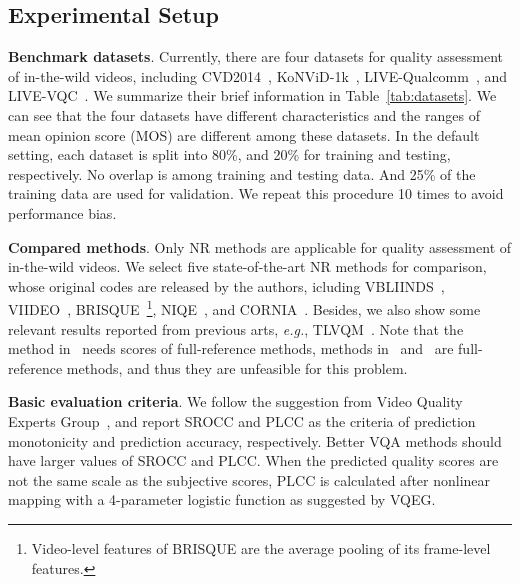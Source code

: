 \documentclass[twocolumn]{svjour3}          \smartqed  \usepackage{graphicx}
\begin{document}
\subsection{Experimental Setup}
\indent\indent\textbf{Benchmark datasets}. 
Currently, there are four datasets for quality assessment of in-the-wild videos, including CVD2014~\citep{nuutinen2016cvd2014}, KoNViD-1k~\citep{hosu2017konstanz}, LIVE-Qualcomm~\citep{ghadiyaram2018capture}, and LIVE-VQC~\citep{sinno2019large}. 
We summarize their brief information in Table~\ref{tab:datasets}. 
We can see that the four datasets have different characteristics and the ranges of mean opinion score (MOS) are different among these datasets. 
In the default setting, each dataset is split into 80\%, and 20\% for training and testing, respectively. 
No overlap is among training and testing data. 
And 25\% of the training data are used for validation.
We repeat this procedure 10 times to avoid performance bias.


\textbf{Compared methods}. 
Only NR methods are applicable for quality assessment of in-the-wild videos.
We select five state-of-the-art NR methods for comparison, whose original codes are released by the authors, icluding VBLIINDS~\citep{saad2014blind}, VIIDEO~\citep{mittal2016completely}, BRISQUE~\citep{mittal2012no}\footnote{Video-level features of BRISQUE are the average pooling of its frame-level features.}, NIQE~\citep{mittal2013making}, and CORNIA~\citep{ye2012unsupervised}. 
Besides, we also show some relevant results reported from previous arts, \textit{e.g.}, TLVQM~\citep{korhonen2019two}. 
Note that the method in~\citet{zhang2018blind} needs scores of full-reference methods, methods in~\citet{kim2018deep} and~\citet{zhang2019objective} are full-reference methods, and thus they are unfeasible for this problem.

\textbf{Basic evaluation criteria}. 
We follow the suggestion from Video Quality Experts Group~\citep{vqeg2000fr}, and report SROCC and PLCC as the criteria of prediction monotonicity and prediction accuracy, respectively. 
Better VQA methods should have larger values of SROCC and PLCC. 
When the predicted quality scores are not the same scale as the subjective scores, PLCC is calculated after nonlinear mapping with a 4-parameter logistic function as suggested by VQEG.
\end{document}
